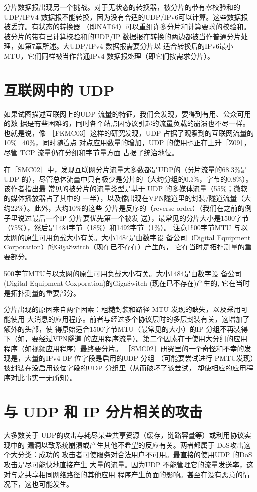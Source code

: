 分片数据报出现另一个挑战。对于无状态的转换器，被分片的带有零校验和的 UDP/IPV4
数据报不能转换，因为没有合适的UDP/IPv6可以计算。这些数据报被丢弃。有状态的转换器
（即NAT64）可以重组许多分片和计算要求的校验和。被分片的带有已计算校验和的UDP/IP
数据报在转换的两边都被当作普通分片处理，如第7章所述。大UDP/IPv4 数据报需要分片以
适合转换后的IPv6最小MTU，它们同样被当作普通IPv4 数据报处理（即它们按需求分片）。

\section{互联网中的 UDP}
如果试图描述互联网上的UDP 流量的特征，我们会发现，要得到有用、公众可用的数
据是有些困难的，同时各个站点因协议引起的流量负载的崩溃也不尽一样。也就是说，像
［FKMC03］这样的研究发现，UDP 占据了观察到的互联网流量的10\% ~40\%，同时随着点
对点应用数量的增加，UDP 的使用也正在上升［Z09］，尽管 TCP 流量仍在分组和字节量方面
占据了统治地位。

在［SMC02］中，发现互联网分片流量大多数都是UDP的（分片流量的68.3\%是UDP
的），尽管总体流量中只有极少是分片的（大约分组的0.3\%，字节的0.8\%）。该作者指出最
常见的被分片的流量类型是基于 UDP 的多媒体流量（55\%；微软的媒体播放器占了其中的
一半），以及像出现在VPN隧道里的封装/隧道流量（大约22\%）。此外，大约10\%的这些
分片是反序的（reverse-order）（我们在之前的例子里说过最后一个IP 分片要优先第一个被发
送），最常见的分片大小是1500字节（75\%），然后是1484字节（18\%）和1492字节（1\%）。
注意1500字节MTU 与以太网的原生可用负载大小有关。大小1484是由数字设
备公司（Digital Equipment Corporation）的GigaSwitch（现在已不存在）产生的，
它在当时是拓扑测量的重要部分。

\begin{tcolorbox}
  500字节MTU与以太网的原生可用负载大小有关。大小1484是由数字设
  备公司(Digital Equipment Coxporation)的GigaSwitch (现在已不存在)产生的,
  它在当时是拓扑测量的重要部分。
\end{tcolorbox}

分片出现的原因来自两个因素：粗糙封装和路径 MTU 发现的缺失，以及采用可能使用
大消息的应用程序。前者与经过多个协议层时的多层封装有关，这增加了额外的头部，使
得原始适合1500字节MTU（最常见的大小）的IP 分组不再装得下（如，要经过VPN隧道
的应用程序流量）。第二个因素在于使用大分组的应用程序（如视频应用程序）最终要分片。
［SMC02］研究里的一个奇怪和不幸的发现是，大量的IPv4 DF 位字段是启用的UDP 分组
（可能要尝试进行 PMTU发现）被封装在没启用该位字段的UDP 分组里（从而破坏了该尝试，
却使相应的应用程序对此事实一无所知）。

\section{与 UDP 和 IP 分片相关的攻击}
大多数关于 UDP的攻击与耗尽某些共享资源（缓存，链路容量等）或利用协议实现中的
漏洞以致系统崩溃或产生其他不希望的反应有关。两者都属于 DoS攻击这个大分类：成功的
攻击者可使服务对合法用户不可用。最直接的使用UDP 的DoS攻击是尽可能快地直接产生
大量的流量。因为UDP 不能管理它的流量发送率，这对与之共享相同网络路径的其他应用
程序产生负面的影响。甚至在没有恶意的情况下，这也可能发生。

